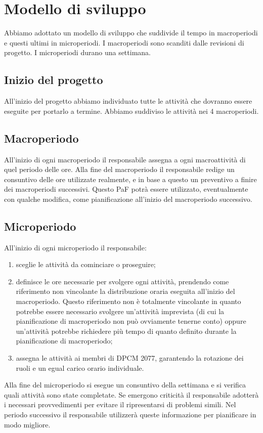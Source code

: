 \section{Modello di sviluppo}
Abbiamo adottato un modello di sviluppo che suddivide il tempo in macroperiodi e questi ultimi in microperiodi. I macroperiodi sono scanditi dalle revisioni di progetto. I microperiodi durano una settimana.

\subsection{Inizio del progetto}
All'inizio del progetto abbiamo individuato tutte le attività che dovranno essere eseguite per portarlo a termine.
Abbiamo suddiviso le attività nei 4 macroperiodi.
\subsection{Macroperiodo}
All'inizio di ogni macroperiodo il responsabile assegna a ogni macroattività di quel periodo delle ore.
Alla fine del macroperiodo il responsabile redige un consuntivo delle ore utilizzate realmente, e in base a questo un preventivo a finire dei macroperiodi successivi. Questo PaF potrà essere utilizzato, eventualmente con qualche modifica, come pianificazione all'inizio del macroperiodo successivo.
\subsection{Microperiodo}
All'inizio di ogni microperiodo il responsabile:
\begin{enumerate}
	\item sceglie le attività da cominciare o proseguire;
	\item definisce le ore necessarie per svolgere ogni attività, prendendo come riferimento non vincolante la distribuzione oraria eseguita all'inizio del macroperiodo. Questo riferimento non è totalmente vincolante in quanto potrebbe essere necessario svolgere un'attività imprevista (di cui la pianificazione di macroperiodo non può ovviamente tenerne conto) oppure un'attività potrebbe richiedere più tempo di quanto definito durante la pianificazione di macroperiodo;
	\item assegna le attività ai membri di DPCM 2077, garantendo la rotazione dei ruoli e un egual carico orario individuale.
\end{enumerate}  

\indent Alla fine del microperiodo si esegue un consuntivo della settimana e si verifica quali attività sono state completate. Se emergono criticità il responsabile adotterà i necessari provvedimenti per evitare il ripresentarsi di problemi simili. Nel periodo successivo il responsabile utilizzerà queste informazione per pianificare in modo migliore.

